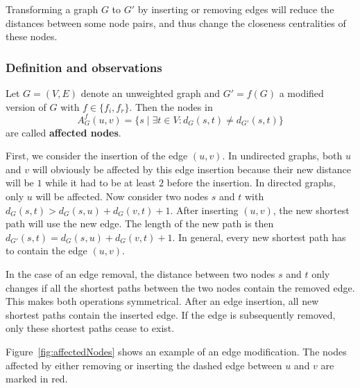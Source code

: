 Transforming a graph $G$ to $G'$ by inserting or removing edges will reduce the distances between some node pairs, and thus change the closeness centralities of these nodes.

\subsubsection{Definition and observations}

\begin{definition}
\label{def:affectedNodes}
	Let $G = (V, E)$ denote an unweighted graph and $G' = f(G)$ a modified version of $G$ with $f \in \{f_i, f_r\}$. Then the nodes in 
	\[
		A_G^f(u, v) = \{s \mid \exists t \in V : d_G(s,t) \neq d_{G'}(s, t)\}
	\] are called \textbf{affected nodes}.
\end{definition}
 
First, we consider the insertion of the edge $(u, v)$. In undirected graphs, both $u$ and $v$ will obviously be affected by this edge insertion because their new distance will be $1$ while it had to be at least $2$ before the insertion. In directed graphs, only $u$ will be affected. Now consider two nodes $s$ and $t$ with $d_G(s, t) > d_G(s, u) + d_G(v, t) + 1$. After inserting $(u, v)$, the new shortest path will use the new edge. The length of the new path is then $d_{G'}(s, t) = d_G(s, u) + d_G(v, t) + 1$. In general, every new shortest path has to contain the edge $(u, v)$.

In the case of an edge removal, the distance between two nodes $s$ and $t$ only changes if all the shortest paths between the two nodes contain the removed edge. This makes both operations symmetrical. After an edge insertion, all new shortest paths contain the inserted edge. If the edge is subsequently removed, only these shortest paths cease to exist.

Figure~\ref{fig:affectedNodes} shows an example of an edge modification. The nodes affected by either removing or inserting the dashed edge between $u$ and $v$ are marked in red.

